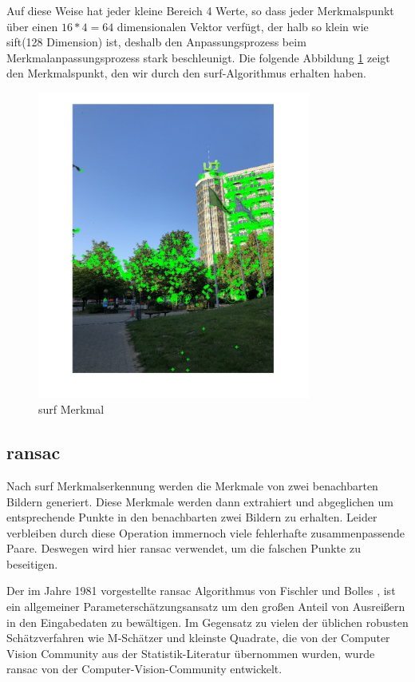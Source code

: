 Auf diese Weise hat jeder kleine Bereich 4 Werte, so dass jeder Merkmalspunkt über einen $16*4=64$ dimensionalen Vektor verfügt, der halb so klein wie \gls{sift}(128 Dimension) ist, deshalb den Anpassungsprozess beim Merkmalanpassungsprozess stark beschleunigt. Die folgende Abbildung \ref{fig:SURF Merkmal} zeigt den Merkmalspunkt, den wir durch den \gls{surf}-Algorithmus erhalten haben.

\begin{figure}[H]
 \centering 
 \includegraphics[keepaspectratio,width=0.8\textwidth]{images/3_Ersteverfahren/SURF_Detektion.pdf}
 \caption{\gls{surf} Merkmal}
 \label{fig:SURF Merkmal}
\end{figure} 


\subsection{\gls{ransac}}

Nach \gls{surf} Merkmalserkennung werden die Merkmale von zwei benachbarten Bildern generiert. Diese Merkmale werden dann extrahiert und abgeglichen um entsprechende Punkte in den benachbarten zwei Bildern zu erhalten. Leider verbleiben durch diese Operation immernoch viele fehlerhafte zusammenpassende Paare. Deswegen wird hier \gls{ransac} verwendet, um die falschen Punkte zu beseitigen.

Der im Jahre 1981 vorgestellte \gls{ransac} Algorithmus von Fischler und Bolles \cite{ransac1}, ist ein allgemeiner Parameterschätzungsansatz um den großen Anteil von Ausreißern in den Eingabedaten zu bewältigen. Im Gegensatz zu vielen der üblichen robusten Schätzverfahren wie M-Schätzer und kleinste Quadrate, die von der Computer Vision Community aus der Statistik-Literatur übernommen wurden, wurde \gls{ransac} von der Computer-Vision-Community entwickelt. 

